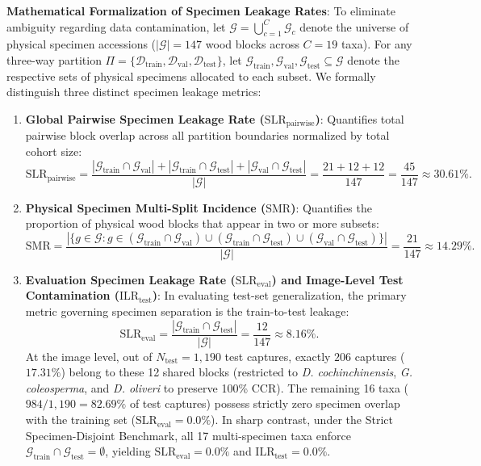 \documentclass[a4paper,fleqn,12pt]{cas-sc}
\begin{document}
\noindent
\textbf{Mathematical Formalization of Specimen Leakage Rates}:
To eliminate ambiguity regarding data contamination, let $\mathcal{G} = \bigcup_{c=1}^C \mathcal{G}_c$ denote the universe of physical specimen accessions ($|\mathcal{G}| = 147$ wood blocks across $C = 19$ taxa). For any three-way partition $\Pi = \{\mathcal{D}_{\text{train}}, \mathcal{D}_{\text{val}}, \mathcal{D}_{\text{test}}\}$, let $\mathcal{G}_{\text{train}}, \mathcal{G}_{\text{val}}, \mathcal{G}_{\text{test}} \subseteq \mathcal{G}$ denote the respective sets of physical specimens allocated to each subset. We formally distinguish three distinct specimen leakage metrics:
\begin{enumerate}[leftmargin=*,itemsep=2pt,topsep=2pt]
    \item \textbf{Global Pairwise Specimen Leakage Rate ($\text{SLR}_{\text{pairwise}}$)}: Quantifies total pairwise block overlap across all partition boundaries normalized by total cohort size:
    \begin{equation}
    \text{SLR}_{\text{pairwise}} = \frac{|\mathcal{G}_{\text{train}} \cap \mathcal{G}_{\text{val}}| + |\mathcal{G}_{\text{train}} \cap \mathcal{G}_{\text{test}}| + |\mathcal{G}_{\text{val}} \cap \mathcal{G}_{\text{test}}|}{|\mathcal{G}|} = \frac{21 + 12 + 12}{147} = \frac{45}{147} \approx 30.61\%.
    \end{equation}
    \item \textbf{Physical Specimen Multi-Split Incidence ($\text{SMR}$)}: Quantifies the proportion of physical wood blocks that appear in two or more subsets:
    \begin{equation}
    \text{SMR} = \frac{|\{ g \in \mathcal{G} : g \in (\mathcal{G}_{\text{train}} \cap \mathcal{G}_{\text{val}}) \cup (\mathcal{G}_{\text{train}} \cap \mathcal{G}_{\text{test}}) \cup (\mathcal{G}_{\text{val}} \cap \mathcal{G}_{\text{test}}) \}|}{|\mathcal{G}|} = \frac{21}{147} \approx 14.29\%.
    \end{equation}
    \item \textbf{Evaluation Specimen Leakage Rate ($\text{SLR}_{\text{eval}}$) and Image-Level Test Contamination ($\text{ILR}_{\text{test}}$)}: In evaluating test-set generalization, the primary metric governing specimen separation is the train-to-test leakage:
    \begin{equation}
    \text{SLR}_{\text{eval}} = \frac{|\mathcal{G}_{\text{train}} \cap \mathcal{G}_{\text{test}}|}{|\mathcal{G}|} = \frac{12}{147} \approx 8.16\%.
    \end{equation}
    At the image level, out of $N_{\text{test}} = 1{,}190$ test captures, exactly $206$ captures ($17.31\%$) belong to these 12 shared blocks (restricted to \textit{D. cochinchinensis}, \textit{G. coleosperma}, and \textit{D. oliveri} to preserve 100\% CCR). The remaining 16 taxa ($984 / 1{,}190 = 82.69\%$ of test captures) possess strictly zero specimen overlap with the training set ($\text{SLR}_{\text{eval}} = 0.0\%$). In sharp contrast, under the Strict Specimen-Disjoint Benchmark, all 17 multi-specimen taxa enforce $\mathcal{G}_{\text{train}} \cap \mathcal{G}_{\text{test}} = \emptyset$, yielding $\text{SLR}_{\text{eval}} = 0.0\%$ and $\text{ILR}_{\text{test}} = 0.0\%$.
\end{enumerate}
\end{document}

